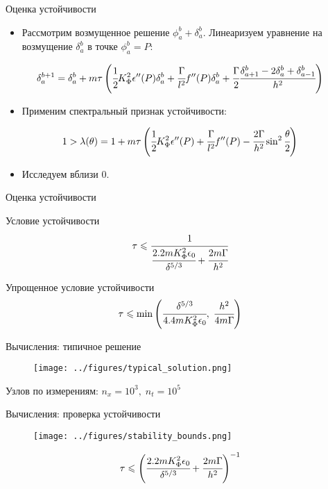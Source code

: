 \documentclass{beamer}
\begin{document}
\begin{frame}{Оценка устойчивости}
\begin{itemize}
\item Рассмотрим возмущенное решение $\phi_a^b + \delta_a^b$. Линеаризуем уравнение на возмущение
$\delta_a^b$ в точке $\phi_a^b = P$:
\end{itemize}
$$\delta_a^{b + 1} = \delta_a^b + m \tau \left( \cfrac{1}{2} K_\Phi^2 \epsilon''(P) \delta_a^b +
\cfrac{\Gamma}{l^2} f''(P) \delta_a^b + \cfrac{\Gamma}{2} \cfrac{\delta_{a + 1}^b - 2 \delta_a^b +
\delta_{a - 1}^b}{h^2} \right)$$
\begin{itemize}
\item Применим спектральный признак устойчивости:
\end{itemize}
$$1 > \lambda(\theta) = 1 + m \tau \left( \cfrac{1}{2} K_\Phi^2 \epsilon''(P) +
\cfrac{\Gamma}{l^2} f''(P) - \cfrac{2 \Gamma}{h^2} \sin^2 \cfrac{\theta}{2} \right)$$
\begin{itemize}
\item Исследуем вблизи $0$.
\end{itemize}
\end{frame}


\begin{frame}{Оценка устойчивости}
\begin{block}{Условие устойчивости}
	$$\tau \leqslant \cfrac{1}{\cfrac{2.2 m K_\Phi^2 \epsilon_0}{\delta^{5/3}} +
	\cfrac{2m \Gamma}{h^2}}$$
\end{block}
\begin{block}{Упрощенное условие устойчивости}
	$$\tau \leqslant \min \left(\cfrac{\delta^{5/3}}{4.4 m K_\Phi^2 \epsilon_0}, \;
	\cfrac{h^2}{4m \Gamma} \right)$$
\end{block}
\end{frame}


\begin{frame}{Вычисления: типичное решение}
\vspace{-0.4cm}
\begin{figure}
	\texttt{[image: ../figures/typical\_solution.png]}
\end{figure}
\vspace{-0.8cm}
\begin{center}
	Узлов по измерениям: $n_x = 10^3, \; n_t = 10^5$
\end{center}
\end{frame}


\begin{frame}{Вычисления: проверка устойчивости}
\vspace{-0.5cm}
\begin{figure}
	\texttt{[image: ../figures/stability\_bounds.png]}
\end{figure}
\vspace{-0.3cm}
$$\tau \leqslant \left( \cfrac{2.2 m K_\Phi^2 \epsilon_0}{\delta^{5/3}} +
\cfrac{2m \Gamma}{h^2} \right)^{-1}$$
\end{frame}
\end{document}
